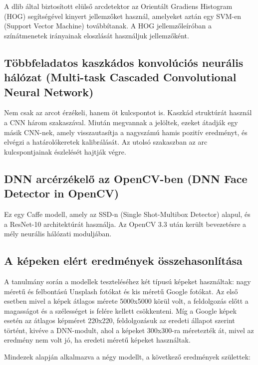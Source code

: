 A dlib által biztosított elülső arcdetektor az Orientált Gradiens Histogram (HOG) segítségével kinyert jellemzőket használ, amelyeket aztán egy SVM-en (Support Vector Machine) továbbítanak. A HOG jellemzőleíróban a színátmenetek irányainak eloszlását használjuk jellemzőként.


\subsection{Többfeladatos kaszkádos konvolúciós neurális hálózat (Multi-task Cascaded Convolutional Neural Network)}

Nem csak az arcot érzékeli, hanem öt kulcspontot is. Kaszkád struktúrát használ a CNN három szakaszával. Miután megvannak a jelöltek, ezeket átadják egy másik CNN-nek, amely visszautasítja a nagyszámú hamis pozitív eredményt, és elvégzi a határolókeretek kalibrálását. Az utolsó szakaszban az arc kulcspontjainak észlelését hajtják végre.


\subsection{DNN arcérzékelő az OpenCV-ben (DNN Face Detector in OpenCV)}

Ez egy Caffe modell, amely az SSD-n (Single Shot-Multibox Detector) alapul, és a ResNet-10 architektúrát használja. Az OpenCV 3.3 után került bevezetésre a mély neurális hálózati moduljában.

\subsection{A képeken elért eredmények összehasonlítása}

A tanulmány során a modellek teszteléséhez két típusú képeket használtak: nagy méretű és felbontású Unsplash fotókat és kis méretű Google fotókat.
Az első esetben mivel a képek átlagos mérete 5000x5000 körül volt, a feldolgozás előtt a magasságot és a szélességet is felére kellett csökkenteni. Míg a Google képek esetén az átlagos képméret 220x220, feldolgozásuk az eredeti állapot szerint történt, kivéve a DNN-modult, ahol a képeket 300x300-ra méretezték át, mivel az eredmény nem volt jó, ha eredeti méretű képeket használtak.

Mindezek alapján alkalmazva a négy modellt, a következő eredmények születtek:

